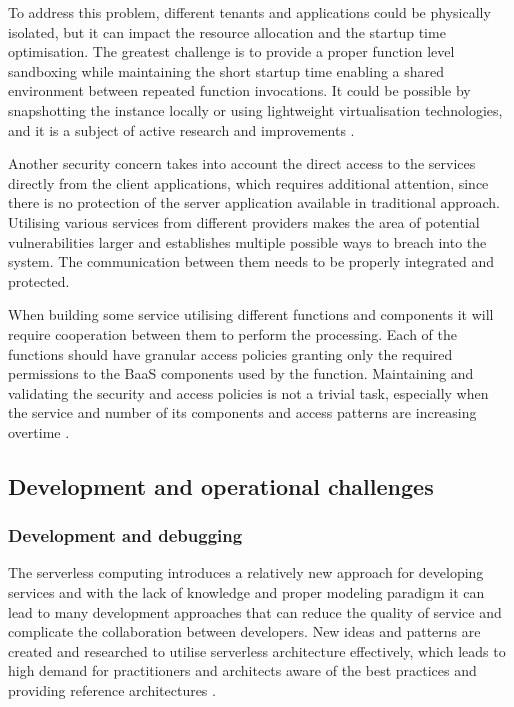 To address this problem, different tenants and applications could be physically isolated, but it can impact the resource allocation and the startup time optimisation. The greatest challenge is to provide a proper function level sandboxing while maintaining the short startup time enabling a shared environment between repeated function invocations. It could be possible by snapshotting the instance locally or using lightweight virtualisation technologies, and it is a subject of active research and improvements \cite{BerkeleyServerless}.

Another security concern takes into account the direct access to the services directly from the client applications, which requires additional attention, since there is no protection of the server application available in traditional approach. Utilising various services from different providers makes the area of potential vulnerabilities larger and establishes multiple possible ways to breach into the system. The communication between them needs to be properly integrated and protected.

When building some service utilising different functions and components it will require cooperation between them to perform the processing. Each of the functions should have granular access policies granting only the required permissions to the BaaS components used by the function. Maintaining and validating the security and access policies is not a trivial task, especially when the service and number of its components and access patterns are increasing overtime \cite{MartinFowlerServerless}.

\subsection{Development and operational challenges}

\subsubsection*{Development and debugging}

The serverless computing introduces a relatively new approach for developing services and with the lack of knowledge and proper modeling paradigm it can lead to many development approaches that can reduce the quality of service and complicate the collaboration between developers. New ideas and patterns are created and researched to utilise serverless architecture effectively, which leads to high demand for practitioners and architects aware of the best practices and providing reference architectures \cite{ServerlessComputingSurveyOfOpportunitiesChallengesApplications}.

